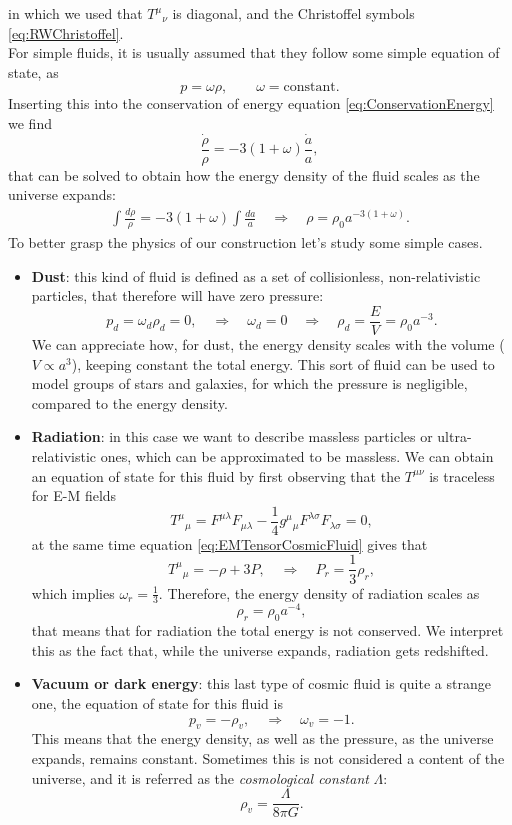 in which we used that $T^\mu\phantom{}_\nu$ is diagonal, and the Christoffel symbols \eqref{eq:RWChristoffel}.\\
For simple fluids, it is usually assumed that they follow some simple equation of state, as
\begin{equation}\label{eq:EquationState}
    p=\omega\rho,\qquad\omega=\text{constant}.
\end{equation}
Inserting this into the conservation of energy equation \eqref{eq:ConservationEnergy} we find
\begin{equation*}
    \frac{\dot\rho}{\rho}=-3(1+\omega)\frac{\dot a }{a},
\end{equation*}
that can be solved to obtain how the energy density of the fluid scales as the universe expands:
\begin{align*}
    \int \frac{d\rho}{\rho}=-3(1+\omega)\int \frac{da}{a} \quad\Rightarrow\quad \boxed{\rho=\rho_0a^{-3(1+\omega)}}.
\end{align*}
\newpage
To better grasp the physics of our construction let's study some simple cases.
\begin{itemize}
    \item \textbf{Dust}: this kind of fluid is defined as a set of collisionless, non-relativistic particles, that therefore will have zero pressure:$$p_d=\omega_d\rho_d=0,\quad\Rightarrow\quad \omega_d=0\quad\Rightarrow\quad\rho_d=\frac{E}{V}=\rho_{0}a^{-3}.$$ We can appreciate how, for dust, the energy density scales with the volume ($V \propto  a^3$), keeping constant the total energy. This sort of fluid can be used to model groups of stars and galaxies, for which the pressure is negligible, compared to the energy density.
    \item \textbf{Radiation}: in this case we want to describe massless particles or ultra-relativistic ones, which can be approximated to be massless. We can obtain an equation of state for this fluid by first observing that the $T^{\mu\nu}$ is traceless for E-M fields $$T^\mu\phantom{}_\mu=F^{\mu\lambda}F_{\mu\lambda}-\frac{1}{4}g^\mu\phantom{}_\mu F^{\lambda\sigma}F_{\lambda\sigma}=0,$$ at the same time equation \eqref{eq:EMTensorCosmicFluid} gives that $$T^\mu\phantom{}_\mu=-\rho+3P,\quad\Rightarrow\quad P_r=\frac{1}{3}\rho_r,$$ which implies $\omega_r=\frac{1}{3}$. Therefore, the energy density of radiation scales as$$\rho_r=\rho_0a^{-4},$$ that means that for radiation the total energy is not conserved. We interpret this as the fact that, while the universe expands, radiation gets redshifted.
    \item \textbf{Vacuum or dark energy}: this last type of cosmic fluid is quite a strange one, the equation of state for this fluid is $$p_v=-\rho_v,\quad \Rightarrow\quad \omega_v=-1.$$ This means that the energy density, as well as the pressure, as the universe expands, remains constant. Sometimes this is not considered a content of the universe, and it is referred as the \emph{cosmological constant} $\Lambda$: $$\rho_v=\frac{\Lambda}{8\pi G}.$$
\end{itemize}
